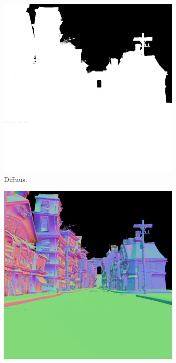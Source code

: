 \begin{figure}
  \begin{subfigure}[b]{.325\textwidth}
    \centering
    \includegraphics[width=\textwidth]{./img/raw/fds-gbuffer-ntiled/diffuus.png}
    \caption{Diffuus.}
    \label{fig:fds-gbuffer-ntiled:diffuse}
  \end{subfigure} %
  \begin{subfigure}[b]{.325\textwidth}
    \centering
    \includegraphics[width=\textwidth]{./img/raw/fds-gbuffer-ntiled/normal.png}

\end{subfigure}
\end{figure}
